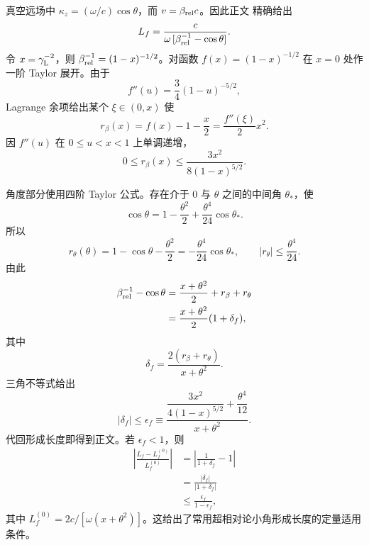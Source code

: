 \begin{derivation}[超相对论辐射的形成长度]
真空远场中 $\kappa_z=(\omega/c)\cos\theta$，而 $v=\beta_{\rm rel}c$。因此正文 精确给出
\begin{equation*}
L_f
=\frac{c}{\omega\,[\beta_{\rm rel}^{-1}-\cos\theta]}.
\end{equation*}
令 $x=\gamma_{\rm L}^{-2}$，则
$\beta_{\rm rel}^{-1}=(1-x)^{-1/2}$。对函数
$f(x)=(1-x)^{-1/2}$ 在 $x=0$ 处作一阶 Taylor 展开。由于
\begin{equation*}
f''(u)=\frac{3}{4}(1-u)^{-5/2},
\end{equation*}
Lagrange 余项给出某个 $\xi\in(0,x)$ 使
\begin{equation*}
r_\beta(x)
=f(x)-1-\frac{x}{2}
=\frac{f''(\xi)}{2}x^2.
\end{equation*}
因 $f''(u)$ 在 $0\le u<x<1$ 上单调递增，
\begin{equation*}
0\le r_\beta(x)
\le\frac{3x^2}{8(1-x)^{5/2}}.
\end{equation*}

角度部分使用四阶 Taylor 公式。存在介于 $0$ 与 $\theta$ 之间的中间角 $\theta_*$，使
\begin{equation*}
\cos\theta
=1-\frac{\theta^2}{2}
+\frac{\theta^4}{24}\cos\theta_*.
\end{equation*}
所以
\begin{equation*}
r_\theta(\theta)
=1-\cos\theta-\frac{\theta^2}{2}
=-\frac{\theta^4}{24}\cos\theta_*,
\qquad
|r_\theta|\le\frac{\theta^4}{24}.
\end{equation*}
由此
\begin{align*}
\beta_{\rm rel}^{-1}-\cos\theta
&=\frac{x+\theta^2}{2}+r_\beta+r_\theta\\
&=\frac{x+\theta^2}{2}(1+\delta_f),
\end{align*}
其中
\begin{equation*}
\delta_f
=\frac{2(r_\beta+r_\theta)}{x+\theta^2}.
\end{equation*}
三角不等式给出
\begin{equation*}
|\delta_f|
\le
{
\epsilon_f
\equiv
\frac{
\dfrac{3x^2}{4(1-x)^{5/2}}
+\dfrac{\theta^4}{12}
}{x+\theta^2}}.
\end{equation*}
代回形成长度即得到正文。若 $\epsilon_f<1$，则
\begin{align*}
\left|\frac{L_f-L_f^{(0)}}{L_f^{(0)}}\right|
&=\left|\frac1{1+\delta_f}-1\right|\\
&=\frac{|\delta_f|}{|1+\delta_f|}\\
&\le\frac{\epsilon_f}{1-\epsilon_f},
\end{align*}
其中
$L_f^{(0)}=2c/[\omega(x+\theta^2)]$。这给出了常用超相对论小角形成长度的定量适用条件。
\end{derivation}


